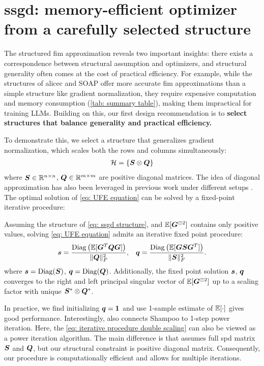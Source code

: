 \section{\gls{ssgd}: memory-efficient optimizer from a carefully selected structure}
\label{sec: ssgd}
The structured \gls{fim} approximation reveals two important insights: there exists a correspondence between structural assumption and optimizers, and structural generality often comes at the cost of practical efficiency. For example, while the structures of \gls{alicec} and SOAP offer more accurate \gls{fim} approximations than a simple structure like gradient normalization, they require expensive computation and memory consumption (\cref{tab: summary table}), making them impractical for training LLMs. Building on this, our first design recommendation is to \textbf{select structures that balance generality and practical efficiency.} 

To demonstrate this, we select a structure that generalizes gradient normalization, which scales both the rows and columns simultaneously:
\begin{align}
    \mathcal{H} = \{{\bm{S}} \otimes {\bm{Q}}\}
    \label{eq: ssgd structure}
\end{align}
where ${\bm{S}}\in\mathbb{R}^{n\times n}$, ${\bm{Q}}\in\mathbb{R}^{m\times m}$ are positive diagonal matrices. The idea of diagonal approximation has also been leveraged in previous work under different setups \citep{zhao2024adapprox, shazeer2018adafactor, li2018preconditioner}. 
The optimal solution of \cref{eq: UFE equation} can be solved by a fixed-point iterative procedure:

\begin{proposition}
Assuming the structure of \cref{eq: ssgd structure}, and $\mathbb{E}[{\bm{G}}^{\odot 2}]$ contains only positive values, solving \cref{eq: UFE equation} admits an iterative fixed point procedure:
\begin{align}
    {\bm{s}} = \frac{\operatorname{Diag}\left(\mathbb{E}[{\bm{G}}^T{\bm{Q}}{\bm{G}}]\right)}{\Vert{\bm{Q}}\Vert_F^2},\;\;\;
    {\bm{q}} =\frac{\operatorname{Diag}\left(\mathbb{E}[{\bm{G}}{\bm{S}}{\bm{G}}^T]\right)}{\Vert{\bm{S}}\Vert_F^2}.
    \label{eq: iterative procedure double scaling}
\end{align}
where ${\bm{s}}=\operatorname{Diag}({\bm{S}})$, ${\bm{q}}=\operatorname{Diag}({\bm{Q}})$.
Additionally, the fixed point solution ${\bm{s}}$, ${\bm{q}}$ converges to the right and left principal singular vector of $\mathbb{E}[{\bm{G}}^{\odot 2}]$ up to a scaling factor with unique ${\bm{S}}^*\otimes {\bm{Q}}^*$.
\label{prop: two sided scaling}
\end{proposition}
In practice, we find initializing ${\bm{q}}=\bm{1}$ and use 1-sample estimate of $\mathbb{E}[\cdot]$ gives good performance. 
Interestingly, \citet{morwani2024new} also connects Shampoo to 1-step power iteration. Here, the \cref{eq: iterative procedure double scaling} can also be viewed as a power iteration algorithm. The main difference is that \citet{morwani2024new} assumes full \gls{spd} matrix ${\bm{S}}$ and ${\bm{Q}}$, but our structural constraint is positive diagonal matrix. Consequently, our procedure is computationally efficient and allows for multiple iterations.


